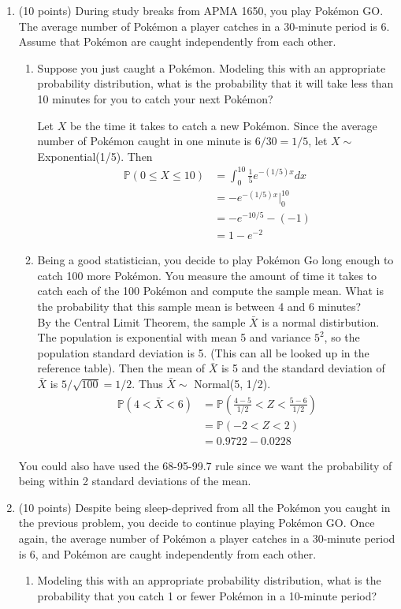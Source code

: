 \documentclass[12pt]{article}
\def\P{{\mathbb P}}
\begin{document}
\begin{enumerate}
\pagebreak 

\item (10 points) During study breaks from APMA 1650, you play Pok\'emon GO. The average number of Pok\'emon a player catches in a 30-minute period is 6. Assume that Pok\'emon are caught independently from each other.
\begin{enumerate}
\item Suppose you just caught a Pok\'emon. Modeling this with an appropriate probability distribution, what is the probability that it will take less than 10 minutes for you to catch your next Pok\'emon? 

Let $X$ be the time it takes to catch a new Pok\'emon. Since the average number of Pok\'emon caught in one minute is $6/30 = 1/5$, let $X \sim $ Exponential(1/5). Then
\begin{align*}
\P(0 \leq X \leq 10) &= \int_0^{10} \frac{1}{5}e^{-(1/5)x} dx \\
&= -e^{-(1/5)x}\Bigr|_0^10 \\
&= -e^{-10/5} - (-1) \\
&= 1 - e^{-2}
\end{align*}
\item Being a good statistician, you decide to play Pok\'emon Go long enough to catch 100 more Pok\'emon. You measure the amount of time it takes to catch each of the 100 Pok\'emon and compute the sample mean. What is the probability that this sample mean is between 4 and 6 minutes?\\

By the Central Limit Theorem, the sample $\bar{X}$ is a normal distirbution. The population is exponential with mean 5 and variance $5^2$, so the population standard deviation is 5. (This can all be looked up in the reference table). Then the mean of $\bar{X}$ is 5 and the standard deviation of $\bar{X}$ is $5/\sqrt{100} = 1/2$. Thus $\bar{X}\sim $ Normal(5, 1/2).
\begin{align*}
\P(4 < \bar{X} < 6) &= \P\left( \frac{4-5}{1/2} < Z < \frac{5-6}{1/2} \right) \\
&= \P( -2 < Z < 2 )\\
&= 0.9722 - 0.0228
\end{align*}
\end{enumerate}
You could also have used the 68-95-99.7 rule since we want the probability of being within 2 standard deviations of the mean.
\pagebreak

\item (10 points) Despite being sleep-deprived from all the Pok\'emon you caught in the previous problem, you decide to continue playing Pok\'emon GO. Once again, the average number of Pok\'emon a player catches in a 30-minute period is 6, and Pok\'emon are caught independently from each other.
\begin{enumerate}
\item Modeling this with an appropriate probability distribution, what is the probability that you catch 1 or fewer Pok\'emon in a 10-minute period?\\


\end{enumerate}
\end{enumerate}
\end{document}
